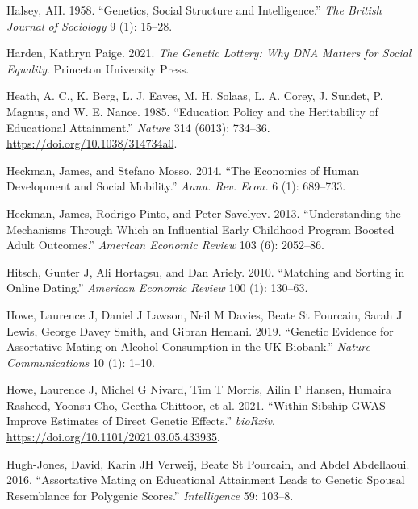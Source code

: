 \documentclass[
]{article}
\newlength{\cslhangindent}
\newlength{\cslentryspacingunit} %
\newenvironment{CSLReferences}[2] %
 {%
  \setlength{\parindent}{0pt}
  \ifodd #1
  \let\oldpar\par
  \def\par{\hangindent=\cslhangindent\oldpar}
  \fi
  \setlength{\parskip}{#2\cslentryspacingunit}
 }%
 {}
\theoremstyle{definition}
\theoremstyle{definition}
\theoremstyle{definition}
\theoremstyle{definition}
\theoremstyle{remark}
\begin{document}
\begin{CSLReferences}{1}{0}
\leavevmode{}%
Halsey, AH. 1958. {``Genetics, Social Structure and Intelligence.''} \emph{The British Journal of Sociology} 9 (1): 15--28.

\leavevmode{}%
Harden, Kathryn Paige. 2021. \emph{The Genetic Lottery: Why DNA Matters for Social Equality}. Princeton University Press.

\leavevmode{}%
Heath, A. C., K. Berg, L. J. Eaves, M. H. Solaas, L. A. Corey, J. Sundet, P. Magnus, and W. E. Nance. 1985. {``Education Policy and the Heritability of Educational Attainment.''} \emph{Nature} 314 (6013): 734--36. \url{https://doi.org/10.1038/314734a0}.

\leavevmode{}%
Heckman, James, and Stefano Mosso. 2014. {``The Economics of Human Development and Social Mobility.''} \emph{Annu. Rev. Econ.} 6 (1): 689--733.

\leavevmode{}%
Heckman, James, Rodrigo Pinto, and Peter Savelyev. 2013. {``Understanding the Mechanisms Through Which an Influential Early Childhood Program Boosted Adult Outcomes.''} \emph{American Economic Review} 103 (6): 2052--86.

\leavevmode{}%
Hitsch, Gunter J, Ali Hortaçsu, and Dan Ariely. 2010. {``Matching and Sorting in Online Dating.''} \emph{American Economic Review} 100 (1): 130--63.

\leavevmode{}%
Howe, Laurence J, Daniel J Lawson, Neil M Davies, Beate St Pourcain, Sarah J Lewis, George Davey Smith, and Gibran Hemani. 2019. {``Genetic Evidence for Assortative Mating on Alcohol Consumption in the UK Biobank.''} \emph{Nature Communications} 10 (1): 1--10.

\leavevmode{}%
Howe, Laurence J, Michel G Nivard, Tim T Morris, Ailin F Hansen, Humaira Rasheed, Yoonsu Cho, Geetha Chittoor, et al. 2021. {``Within-Sibship GWAS Improve Estimates of Direct Genetic Effects.''} \emph{bioRxiv}. \url{https://doi.org/10.1101/2021.03.05.433935}.

\leavevmode{}%
Hugh-Jones, David, Karin JH Verweij, Beate St Pourcain, and Abdel Abdellaoui. 2016. {``Assortative Mating on Educational Attainment Leads to Genetic Spousal Resemblance for Polygenic Scores.''} \emph{Intelligence} 59: 103--8.


\end{CSLReferences}
\end{document}

